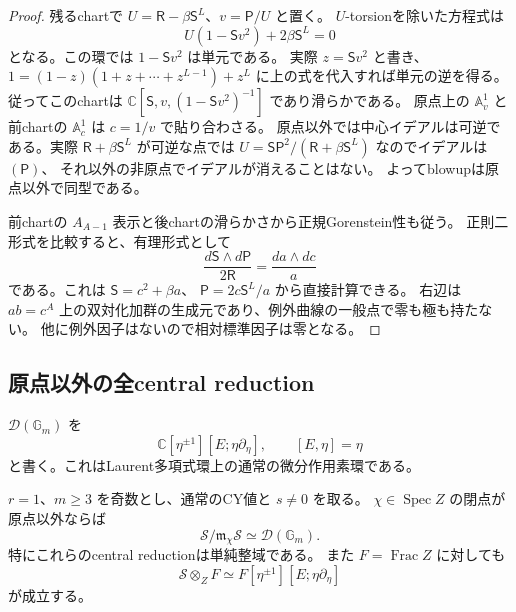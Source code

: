 \begin{proof}
残るchartで $U=\mathsf R-\beta\mathsf S^L$、$v=\mathsf P/U$ と置く。
$U$-torsionを除いた方程式は
\[
 U(1-\mathsf Sv^2)+2\beta\mathsf S^L=0
\]
となる。この環では $1-\mathsf Sv^2$ は単元である。
実際 $z=\mathsf Sv^2$ と書き、
$1=(1-z)(1+z+\cdots+z^{L-1})+z^L$ に上の式を代入すれば単元の逆を得る。
従ってこのchartは
$\mathbb C[\mathsf S,v,(1-\mathsf Sv^2)^{-1}]$ であり滑らかである。
原点上の $\mathbb A^1_v$ と前chartの $\mathbb A^1_c$ は $c=1/v$ で貼り合わさる。
原点以外では中心イデアルは可逆である。実際
$\mathsf R+\beta\mathsf S^L$ が可逆な点では
$U=\mathsf S\mathsf P^2/(\mathsf R+\beta\mathsf S^L)$ なのでイデアルは $(\mathsf P)$、
それ以外の非原点でイデアルが消えることはない。
よってblowupは原点以外で同型である。

前chartの $A_{A-1}$ 表示と後chartの滑らかさから正規Gorenstein性も従う。
正則二形式を比較すると、有理形式として
\[
 \frac{d\mathsf S\wedge d\mathsf P}{2\mathsf R}
       =\frac{da\wedge dc}{a}
\]
である。これは $\mathsf S=c^2+\beta a$、
$\mathsf P=2c\mathsf S^L/a$ から直接計算できる。
右辺は $ab=c^A$ 上の双対化加群の生成元であり、例外曲線の一般点で零も極も持たない。
他に例外因子はないので相対標準因子は零となる。
\end{proof}

\subsection{原点以外の全central reduction}

$\mathcal D(\mathbb G_m)$ を
\[
 \mathbb C[\eta^{\pm1}][E;\eta\partial_\eta],\qquad
 [E,\eta]=\eta
\]
と書く。これはLaurent多項式環上の通常の微分作用素環である。

\begin{theorem}[滑らかな中心点における特殊化]
\label{thm:central-reductions-v35}
$r=1$、$m\ge3$ を奇数とし、通常のCY値と $s\ne0$ を取る。
$\chi\in\operatorname{Spec}Z$ の閉点が原点以外ならば
\[
 \boxed{\mathcal S/\mathfrak m_\chi\mathcal S
          \simeq\mathcal D(\mathbb G_m).}
\]
特にこれらのcentral reductionは単純整域である。
また $F=\operatorname{Frac}Z$ に対しても
\[
 \mathcal S\otimes_ZF
 \simeq F[\eta^{\pm1}][E;\eta\partial_\eta]
\]
が成立する。
\end{theorem}

